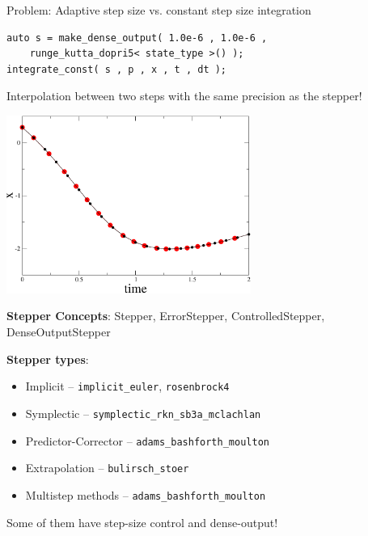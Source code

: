\begin{frame}[fragile]


\vspace{2ex}

Problem: Adaptive step size vs. constant step size integration 
 
\begin{lstlisting}
auto s = make_dense_output( 1.0e-6 , 1.0e-6 ,
    runge_kutta_dopri5< state_type >() );
integrate_const( s , p , x , t , dt );
\end{lstlisting}

Interpolation between two steps with the same precision as the stepper!

\vspace{2ex}

\centerline{\includegraphics[draft=false,width=0.6\textwidth]{vdp_dense_output.pdf}}

\end{frame}







\begin{frame}

 \vspace{2ex}

 {\bf Stepper Concepts}: Stepper, ErrorStepper, ControlledStepper, DenseOutputStepper

 \vspace{2ex}

 {\bf Stepper types}: 
 \begin{itemize}
  \item Implicit -- {\tt implicit\_euler}, {\tt rosenbrock4}
  \item Symplectic -- {\tt symplectic\_rkn\_sb3a\_mclachlan}
  \item Predictor-Corrector -- {\tt adams\_bashforth\_moulton}
  \item Extrapolation -- {\tt bulirsch\_stoer}
  \item Multistep methods -- {\tt adams\_bashforth\_moulton}
 \end{itemize}

 \vspace{2ex}
 Some of them have step-size control and dense-output!

\end{frame}




